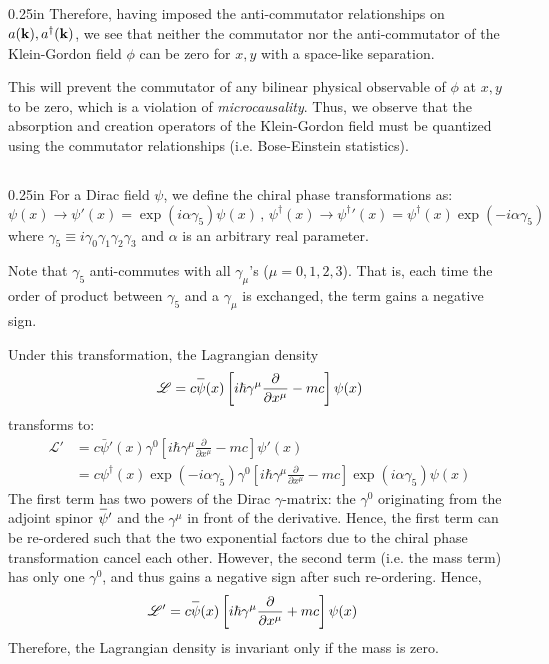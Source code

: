 \documentclass[letterpaper,12pt]{article}
\newenvironment{problem}{\subsection{}\begin{adjustwidth}{0.25in}{}\vspace{-\baselineskip}}{\end{adjustwidth}}
\newcommand{\pder}[2]{\frac{\partial #1}{\partial #2}}
\newcommand{\lagr}{\mathscr{L}}
\newcommand{\define}{\equiv}
\newcommand{\overbar}[1]{
	\mkern 1.5mu \overline{\mkern-1.5mu\raisebox{0pt}[\dimexpr\height+0.5mm\relax]{$#1$}\mkern-1.5mu}\mkern 1.5mu
}
\begin{document}
\begin{problem}
Therefore, having imposed the anti-commutator relationships on $a(\vb{k}), a^\dagger(\vb{k})$, we see that neither the commutator nor the anti-commutator of the Klein-Gordon field $\phi$ can be zero for $x,y$ with a space-like separation.

This will prevent the commutator of any bilinear physical observable of $\phi$ at $x,y$ to be zero, which is a violation of \emph{microcausality}. Thus, we observe that the absorption and creation operators of the Klein-Gordon field must be quantized using the commutator relationships (i.e. Bose-Einstein statistics).
\end{problem}

\pagebreak

\begin{problem}
For a Dirac field $\psi$, we define the chiral phase transformations as:
\begin{equation*}
	\psi(x) \rightarrow \psi'(x) = \exp(i\alpha\gamma_5)\psi(x) \,, \,
	\psi^\dagger(x) \rightarrow {\psi^\dagger}'(x) = \psi^\dagger(x)\exp(-i\alpha\gamma_5)
\end{equation*}
where $\gamma_5 \define i\gamma_0\gamma_1\gamma_2\gamma_3$ and $\alpha$ is an arbitrary real parameter.

Note that $\gamma_5$ anti-commutes with all $\gamma_\mu$'s ($\mu=0, 1, 2, 3$). That is, each time the order of product between $\gamma_5$ and a $\gamma_\mu$ is exchanged, the term gains a negative sign.

Under this transformation, the Lagrangian density
\begin{equation*}
	\lagr = c\overbar{\psi}(x)\left[i\hbar\gamma^\mu\pder{}{x^\mu} - mc\right]\psi(x)
\end{equation*}
transforms to:
\begin{align*}
	\lagr' &= c {\bar{\psi}}'(x) \gamma^0 \left[i\hbar\gamma^\mu\pder{}{x^\mu} - mc\right] \psi'(x)	\\
	&= c \psi^\dagger(x) \exp(-i\alpha\gamma_5) \gamma^0 \left[i\hbar\gamma^\mu\pder{}{x^\mu} - mc\right] \exp(i\alpha\gamma_5) \psi(x)
\end{align*}
The first term has two powers of the Dirac $\gamma$-matrix: the $\gamma^0$ originating from the adjoint spinor $\overbar{\psi}'$ and the $\gamma^\mu$ in front of the derivative. Hence, the first term can be re-ordered such that the two exponential factors due to the chiral phase transformation cancel each other. However, the second term (i.e. the mass term) has only one $\gamma^0$, and thus gains a negative sign after such re-ordering. Hence,
\begin{align*}
	\lagr' &= c \overbar{\psi}(x)\left[i\hbar\gamma^\mu\pder{}{x^\mu} + mc\right]\psi(x)
\end{align*}
Therefore, the Lagrangian density is invariant only if the mass is zero.


\end{problem}
\end{document}
